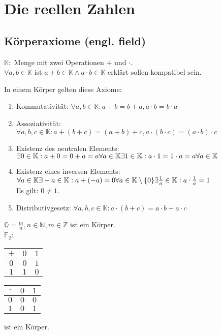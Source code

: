 \documentclass[../ana1.tex]{subfiles}
\begin{document}
\setcounter{section}{2}

\section{Die reellen Zahlen}
\subsection{Körperaxiome (engl. field)}
\(\mathbb{K:}\) Menge mit zwei Operationen \glqq{}\(+\)\grqq{} und \glqq{}\(\cdot\)\grqq{}.\\
\(\forall a,b \in \mathbb{K}\) ist \(a+b\in \mathbb{K} \wedge a\cdot b \in \mathbb{K}\) erklärt sollen kompatibel sein.
\begin{defi}[Körperaxiome]
	In einem Körper gelten diese Axiome:
	\begin{enumerate}
		\item Kommutativität: \(\forall a,b\in \mathbb{K}: a+b=b+a, a\cdot b=b\cdot a\)
		\item Assoziativität: \(\forall a,b,c\in \mathbb{K}: a+(b+c) = (a+b)+c, a\cdot (b\cdot c) = (a\cdot b)\cdot c\)
		\item Existenz des neutralen Elements: \\
		      \(\exists 0 \in \mathbb{K}: a + 0 = 0 + a = a \forall a\in \mathbb{K}\\
			      \exists 1 \in \mathbb{K}: a \cdot 1 = 1 \cdot a = a \forall a\in\mathbb{K}\)
		\item Existenz eines inversen Elements:\\
		      \(\forall a\in\mathbb{K}\exists -a\in\mathbb{K}:a+ (-a)=0\\
			      \forall a\in\mathbb{K}\setminus\{0\}\exists \frac{1}{a}\in\mathbb{K}:a\cdot\frac{1}{a}=1\)\\
		      Es gilt: \(0\neq1\).
		\item Distributivgesetz: \(\forall a,b,c\in\mathbb{K}:a\cdot(b+c)=a\cdot b + a \cdot c\)
	\end{enumerate}
\end{defi}
\begin{bsp}
	\(\mathbb{Q} = \frac{m}{n}, n \in \mathbb{N}, m\in\mathbb{Z}\) ist ein Körper.\\
	\(\mathbb{F}_2\):
	\begin{tabular}{c|cc}
		\(+\) & \(0\) & \(1\) \\
		\hline
		\(0\) & \(0\) & \(1\) \\
		\(1\) & \(1\) & \(0\)
	\end{tabular}
	\begin{tabular}{c|cc}
		\(\cdot\) & \(0\) & \(1\) \\
		\hline
		\(0\)     & \(0\) & \(0\) \\
		\(1\)     & \(0\) & \(1\)
	\end{tabular}
	ist ein Körper.
\end{bsp}
\end{document}
